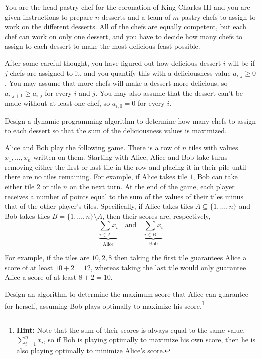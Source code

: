 \documentclass[11pt]{article}
\theoremstyle{definition}
\begin{document}
\begin{enumerate}[leftmargin=0pt, itemsep=3ex]
	
\problemitem
You are the head pastry chef for the coronation of King Charles III and you are given instructions to prepare $n$ desserts and a team of $m$ pastry chefs to assign to work on the different desserts.  All of the chefs are equally competent, but each chef can work on only one dessert, and you have to decide how many chefs to assign to each dessert to make the most delicious feast possible.

After some careful thought, you have figured out how delicious dessert $i$ will be if $j$ 
chefs are assigned to it, and you quantify this with a deliciousness value $a_{i,j} \geq 0$.  You may assume that more chefs will make a dessert more delicious, so $a_{i,j+1} \geq a_{i,j}$ for every $i$ and $j$.  You may also assume that the dessert can't be made without at least one chef, so $a_{i,0} = 0$ for every $i$.

Design a dynamic programming algorithm to determine how many chefs to assign to each dessert so that the sum of the deliciousness values is maximized.
\newpage

\problemitem
Alice and Bob play the following game.  There is a row of $n$ tiles with values $x_1,\dots,x_n$ written on them.  Starting with Alice, Alice and Bob take turns removing either the first or last tile in the row and placing it in their pile until there are no tiles remaining.  For example, if Alice takes tile $1$, Bob can take either tile $2$ or tile $n$ on the next turn.  At the end of the game, each player receives a number of points equal to the sum of the values of their tiles minus that of the other player's tiles.  Specifically, if Alice takes tiles $A \subseteq \{1,\dots,n\}$ and Bob takes tiles $B = \{1,\dots,n\} \setminus A$, then their scores are, respectively,
$$
\underbrace{\sum_{i \in A} x_i}_{\text{Alice}} \quad \textrm{and} \quad \underbrace{\sum_{i \in B} x_i}_{\text{Bob}}
$$

For example, if the tiles are $10, 2, 8$ then taking the first tile guarantees Alice a score of at least $10 + 2 = 12$, whereas taking the last tile would only guarantee Alice a score of at least $8 + 2 = 10$.

Design an algorithm to determine the maximum score that Alice can guarantee for herself, assuming Bob plays optimally to maximize his score.\footnote{\textbf{Hint:} Note that the sum of their scores is always equal to the same value, $\sum_{i=1}^{n} x_i$, so if Bob is playing optimally to maximize his own score, then he is also playing optimally to minimize Alice's score.}


\end{enumerate}
\end{document}

